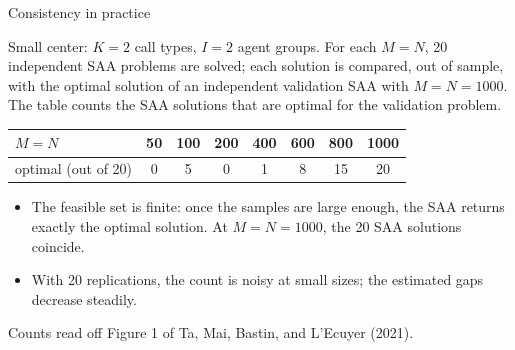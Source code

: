 \documentclass[aspectratio=169]{beamer}
\begin{document}
\begin{frame}{Consistency in practice}
	
	Small center: $K = 2$ call types, $I = 2$ agent groups.
	For each $M = N$, 20 independent SAA problems are solved; each solution is compared, out of sample, with the optimal solution of an independent {\blue validation} SAA with $M = N = 1000$. The table counts the SAA solutions that are optimal for the validation problem.
	
	\begin{center}
		\begin{tabular}{l|ccccccc}
			$M = N$ & 50 & 100 & 200 & 400 & 600 & 800 & 1000 \\
			\hline
			optimal (out of 20) & 0 & 5 & 0 & 1 & 8 & 15 & 20
		\end{tabular}
	\end{center}
	
	\begin{itemize}
		\item
		The feasible set is finite: once the samples are large enough, the SAA returns {\red exactly} the optimal solution. At $M = N = 1000$, the 20 SAA solutions coincide.
		\item
		With 20 replications, the count is noisy at small sizes; the estimated gaps decrease steadily.
	\end{itemize}
	
	{\footnotesize Counts read off Figure 1 of Ta, Mai, Bastin, and L'Ecuyer (2021).}
	
\end{frame}
\end{document}
